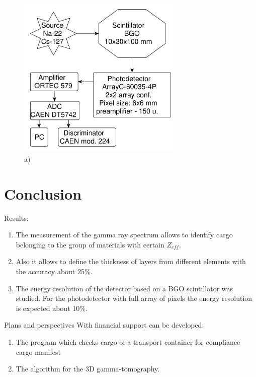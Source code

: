 \documentclass[a4paper]{panl}
\begin{document}
\begin{figure}[t]
    \begin{center}
        \includegraphics[width=80mm]{figures/yed.pdf}  
        \vspace{-3mm}
        \caption{a) }
    \end{center}
    \vspace{-5mm}
\end{figure}
\section*{Conclusion}
Results:   
    \begin{enumerate}
        \item The measurement of the gamma ray spectrum allows to identify cargo belonging to the group of materials with certain $Z_{eff}$.
        \item Also it allows to define the thickness of layers from different elements with the accuracy about 25\%.
        \item The energy resolution of the detector based on a BGO scintillator was studied.  For the photodetector with full array of pixels the energy resolution is expected about 10\%.
    \end{enumerate}
Plans and perspectives
    With financial support can be developed:
    \begin{enumerate}
        \item The program which checks cargo of a transport container  for compliance cargo manifest
        \item The algorithm for the 3D gamma-tomography.
    \end{enumerate}
\end{document}

